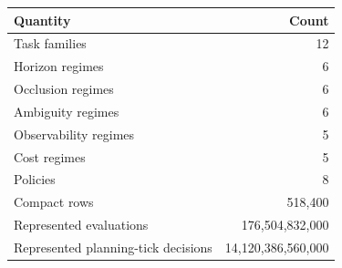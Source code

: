 \begin{tabular}{lr}
\toprule
Quantity & Count \\
\midrule
Task families & 12 \\
Horizon regimes & 6 \\
Occlusion regimes & 6 \\
Ambiguity regimes & 6 \\
Observability regimes & 5 \\
Cost regimes & 5 \\
Policies & 8 \\
Compact rows & 518,400 \\
Represented evaluations & 176,504,832,000 \\
Represented planning-tick decisions & 14,120,386,560,000 \\
\bottomrule
\end{tabular}
